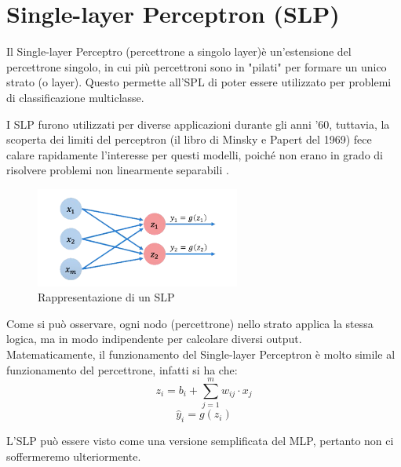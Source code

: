\section{Single-layer Perceptron (SLP)}
Il Single-layer Perceptro (percettrone a singolo layer)è un'estensione del 
percettrone singolo, in cui più percettroni sono in "pilati" per formare un unico strato (o layer). Questo permette all'SPL di poter
essere utilizzato per problemi di classificazione multiclasse.

I SLP furono utilizzati per diverse applicazioni durante gli anni '60, tuttavia, 
la scoperta dei limiti del perceptron (il libro di Minsky e Papert del 1969) 
fece calare rapidamente l'interesse per questi modelli, poiché non erano in 
grado di risolvere problemi non linearmente separabili \cite{ALL_SLP}.

\begin{figure}[H]
    \centering
    \includegraphics[width=0.60\textwidth]{Immagini/Generiche/SLP.png}
    \caption{Rappresentazione di un SLP}
    \label{fig:SingleLayerPerceptrons}
\end{figure}
Come si può osservare, ogni nodo (percettrone) nello strato applica la stessa logica, 
ma in modo indipendente per calcolare diversi output.
\\Matematicamente, il funzionamento del Single-layer Perceptron è molto simile al funzionamento
del percettrone, infatti si ha che:
\begin{equation}
    z_i =  b_i + \sum_{j=1}^{m} w_{ij}\cdot x_j%
\end{equation}
\begin{equation}
    \hat{y}_i= g\left(z_i\right)
\end{equation}

L'SLP può essere visto come una versione semplificata del MLP, pertanto non
ci soffermeremo ulteriormente.


